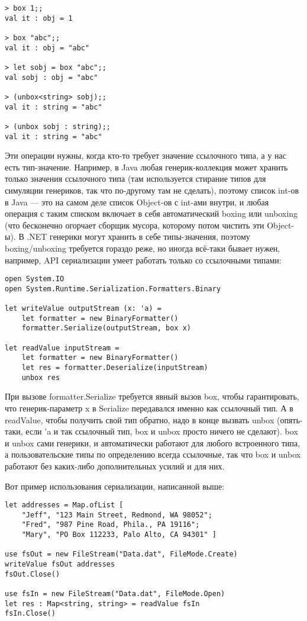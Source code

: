 \documentclass[a5paper]{article}
\begin{document}
\begin{verbatim}
> box 1;;
val it : obj = 1

> box "abc";;
val it : obj = "abc"

> let sobj = box "abc";;
val sobj : obj = "abc"

> (unbox<string> sobj);;
val it : string = "abc"

> (unbox sobj : string);;
val it : string = "abc"
\end{verbatim}

Эти операции нужны, когда кто-то требует значение ссылочного типа, а у нас есть тип-значение. Например, в Java любая генерик-коллекция может хранить только значения ссылочного типа (там используется стирание типов для симуляции генериков, так что по-другому там не сделать), поэтому список int-ов в Java --- это на самом деле список Object-ов с int-ами внутри, и любая операция с таким списком включает в себя автоматический boxing или unboxing (что бесконечно огорчает сборщик мусора, которому потом чистить эти Object-ы). В .NET генерики могут хранить в себе типы-значения, поэтому boxing/unboxing требуется гораздо реже, но иногда всё-таки бывает нужен, например, API сериализации умеет работать только со ссылочными типами:

\begin{verbatim}
open System.IO
open System.Runtime.Serialization.Formatters.Binary

let writeValue outputStream (x: 'a) =
    let formatter = new BinaryFormatter()
    formatter.Serialize(outputStream, box x)

let readValue inputStream =
    let formatter = new BinaryFormatter()
    let res = formatter.Deserialize(inputStream)
    unbox res
\end{verbatim}

При вызове formatter.Serialize требуется явный вызов box, чтобы гарантировать, что генерик-параметр x в Serialize передавался именно как ссылочный тип. А в readValue, чтобы получить свой тип обратно, надо в конце вызвать unbox (опять-таки, если 'a и так ссылочный тип, box и unbox просто ничего не сделают). box и unbox сами генерики, и автоматически работают для любого встроенного типа, а пользовательские типы по определению всегда ссылочные, так что box и unbox работают без каких-либо дополнительных усилий и для них.

Вот пример использования сериализации, написанной выше:

\begin{verbatim}
let addresses = Map.ofList [ 
    "Jeff", "123 Main Street, Redmond, WA 98052";
    "Fred", "987 Pine Road, Phila., PA 19116";
    "Mary", "PO Box 112233, Palo Alto, CA 94301" ]

use fsOut = new FileStream("Data.dat", FileMode.Create)
writeValue fsOut addresses
fsOut.Close()

use fsIn = new FileStream("Data.dat", FileMode.Open)
let res : Map<string, string> = readValue fsIn
fsIn.Close()
\end{verbatim}
\end{document}
